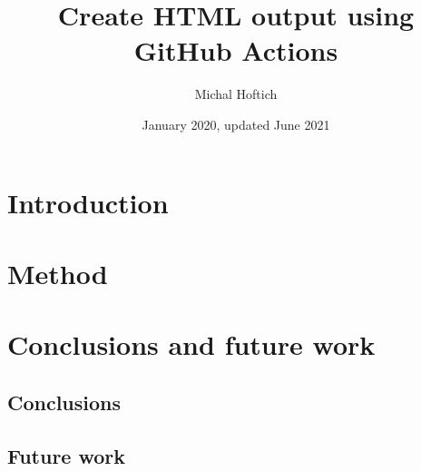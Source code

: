 \documentclass{article}
\title{Create HTML output using GitHub Actions}
\author{Michal Hoftich}
\date{January 2020, updated June 2021}
\begin{document}
\maketitle

\section{Introduction}

\section{Method}


 \section{Conclusions and future work} %
    \subsection{Conclusions}

	\subsection{Future work}



\end{document}
